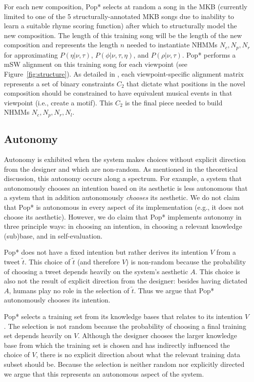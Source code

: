 \documentclass[phd,electronic,oneside,twosidetoc,letterpaper,chaptercenter,parttop,lof,lot]{byumsphd}
\begin{document}
For each new composition, Pop* selects at random a song in the MKB (currently limited to one of the 5 structurally-annotated MKB songs due to inability to learn a suitable rhyme scoring function) after which to structurally model the new composition. The length of this training song will be the length of the new composition and represents the length $n$ needed to instantiate NHMMs $N_c, N_p, N_r$ for approximating $P(\eta|\nu,\tau)$, $P(\phi|\nu,\tau,\eta)$, and $P(\rho|\nu,\tau)$. Pop* performs a mSW alignment on this training song for each viewpoint (see Figure~\ref{fig:structure}). As detailed in \cite{bodily2018abstract}, each viewpoint-specific alignment matrix represents a set of binary constraints $C_2$ that dictate what positions in the novel composition should be constrained to have equivalent musical events in that viewpoint (i.e., create a motif). This $C_2$ is the final piece needed to build NHMMs $N_c, N_p, N_r, N_l$. 

\subsection{Autonomy}

Autonomy is exhibited when the system makes choices without explicit direction from the designer and which are non-random. As mentioned in the theoretical discussion, this autonomy occurs along a spectrum. For example, a system that autonomously chooses an intention based on its aesthetic is less autonomous that a system that in addition autonomously \textit{chooses} its aesthetic. We do not claim that Pop* is autonomous in every aspect of its implementation (e.g., it does not choose its aesthetic). However, we do claim that Pop* implements autonomy in three principle ways: in choosing an intention, in choosing a relevant knowledge (sub)base, and in self-evaluation.

Pop* does not have a fixed intention but rather derives its intention $V$ from a tweet $\tilde{t}$. This choice of $\tilde{t}$ (and therefore $V$) is non-random because the probability of choosing a tweet depends heavily on the system's aesthetic $A$. This choice is also not the result of explicit direction from the designer: besides having dictated $A$, humans play no role in the selection of $\tilde{t}$. Thus we argue that Pop* autonomously chooses its intention.

Pop* selects a training set from its knowledge bases that relates to its intention $V$. The selection is not random because the probability of choosing a final training set depends heavily on $V$. Although the designer chooses the larger knowledge base from which the training set is chosen and has indirectly influenced the choice of $V$, there is no explicit direction about what the relevant training data subset should be. Because the selection is neither random nor explicitly directed we argue that this represents an autonomous aspect of the system.
\end{document}
